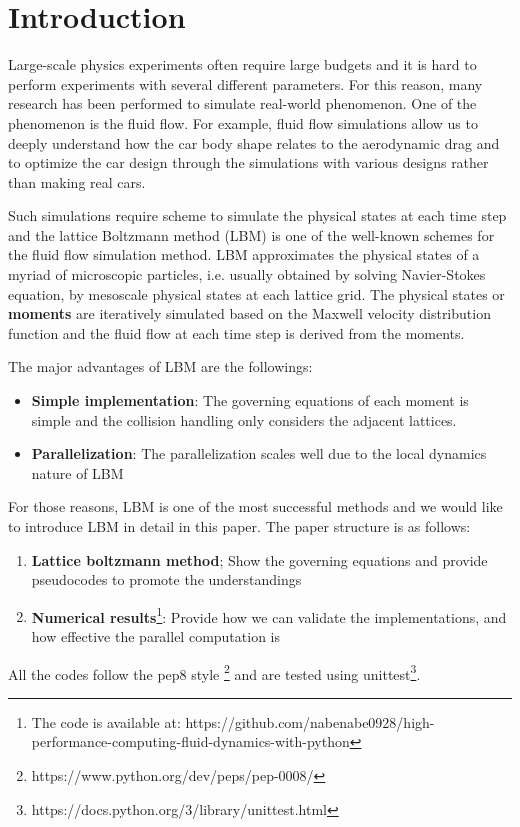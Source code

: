 \chapter{Introduction}
\vspace{-8mm}
Large-scale physics experiments often require large budgets
and it is hard to perform experiments with several different parameters.
For this reason, many research has been performed to simulate real-world 
phenomenon.
One of the phenomenon is the fluid flow.
For example, fluid flow simulations allow us to deeply understand
how the car body shape relates to the aerodynamic drag
and to optimize the car design through the simulations with
various designs rather than making real cars\cite{padagannavar2016automotive}.

Such simulations require scheme to simulate the physical states
at each time step
and the lattice Boltzmann method (LBM) \cite{timm2016lattice}
is one of the well-known
schemes for the fluid flow simulation method.
LBM approximates the physical states of a myriad of microscopic particles,
i.e. usually obtained by solving Navier-Stokes equation,
by mesoscale physical states at each lattice grid.
The physical states or {\bf moments} are iteratively simulated based on
the Maxwell velocity distribution function\cite{huang1963statistical} and
the fluid flow at each time step is derived from the moments.

The major advantages of LBM are the followings:
\begin{itemize}
  \item {\bf Simple implementation}: The governing equations of each moment
  is simple and the collision handling only considers the adjacent lattices. 
  \item {\bf Parallelization}: The parallelization scales well due to
  the local dynamics nature of LBM\cite{raabe2004overview}
\end{itemize}
For those reasons, LBM is one of the most successful methods and
we would like to introduce LBM in detail in this paper.
The paper structure is as follows:
\begin{enumerate}
  \item {\bf Lattice boltzmann method}; Show the governing equations and 
  provide pseudocodes to promote the understandings
  \item {\bf Numerical results}\footnote{
  The code is available at:
    https://github.com/nabenabe0928/high-performance-computing-fluid-dynamics-with-python
  }: Provide how we can validate the implementations,
  and how effective the parallel computation is
\end{enumerate}
All the codes follow the pep8 style
\footnote{https://www.python.org/dev/peps/pep-0008/} and 
are tested using
unittest\footnote{https://docs.python.org/3/library/unittest.html}.
